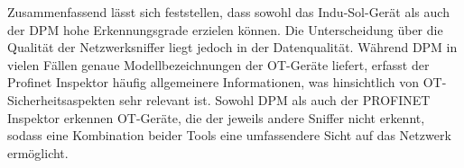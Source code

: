 \bigskip
\noindent Zusammenfassend lässt sich feststellen, dass sowohl das Indu-Sol-Gerät als auch der DPM hohe Erkennungsgrade erzielen können. Die Unterscheidung über die Qualität der Netzwerksniffer liegt jedoch in der Datenqualität. Während DPM in vielen Fällen genaue Modellbezeichnungen der OT-Geräte liefert, erfasst der Profinet Inspektor häufig allgemeinere Informationen, was hinsichtlich von OT-Sicherheitsaspekten sehr relevant ist. Sowohl DPM als auch der PROFINET Inspektor erkennen OT-Geräte, die der jeweils andere Sniffer nicht erkennt, sodass eine Kombination beider Tools eine umfassendere Sicht auf das Netzwerk ermöglicht.








